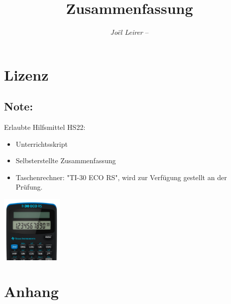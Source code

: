 \documentclass[margin=normal]{tex/hsrzf}
\author{\textsl{Joël Leirer} -- \texttt{\theauthoremail}}
\title{\texttt{\themodule} Zusammenfassung}
\date{\thesemester}
\begin{document}

\maketitle



\section*{Lizenz}
\doclicenseThis

\subsection*{Note:}
Erlaubte Hilfsmittel HS22:
\begin{itemize}
    \item Unterrichtsskript
    \item Selbsterstellte Zusammenfassung
    \item Taschenrechner: "TI-30 ECO RS", wird zur Verfügung gestellt an der Prüfung.
\end{itemize}
\includegraphics[width=3cm]{img/Taschenrechner.png}

\newpage
\tableofcontents

\newpage
\setcounter{page}{1}






\newpage
\section{Anhang}


\end{document}
